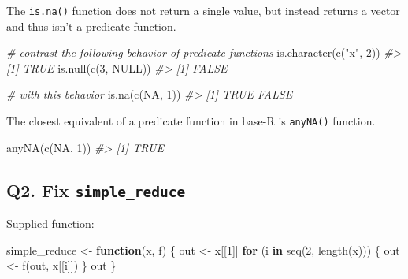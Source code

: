 \documentclass[
]{book}
\newenvironment{Shaded}{\begin{snugshade}}{\end{snugshade}}
\newcommand{\CommentTok}[1]{\textcolor[rgb]{0.56,0.35,0.01}{\textit{#1}}}
\newcommand{\ConstantTok}[1]{\textcolor[rgb]{0.00,0.00,0.00}{#1}}
\newcommand{\ControlFlowTok}[1]{\textcolor[rgb]{0.13,0.29,0.53}{\textbf{#1}}}
\newcommand{\DecValTok}[1]{\textcolor[rgb]{0.00,0.00,0.81}{#1}}
\newcommand{\FunctionTok}[1]{\textcolor[rgb]{0.00,0.00,0.00}{#1}}
\newcommand{\NormalTok}[1]{#1}
\newcommand{\OtherTok}[1]{\textcolor[rgb]{0.56,0.35,0.01}{#1}}
\newcommand{\StringTok}[1]{\textcolor[rgb]{0.31,0.60,0.02}{#1}}
\begin{document}
The \texttt{is.na()} function does not return a single value, but instead returns a vector and thus isn't a predicate function.

\begin{Shaded}
\begin{Highlighting}[]
\CommentTok{\# contrast the following behavior of predicate functions}
\FunctionTok{is.character}\NormalTok{(}\FunctionTok{c}\NormalTok{(}\StringTok{"x"}\NormalTok{, }\DecValTok{2}\NormalTok{))}
\CommentTok{\#\textgreater{} [1] TRUE}
\FunctionTok{is.null}\NormalTok{(}\FunctionTok{c}\NormalTok{(}\DecValTok{3}\NormalTok{, }\ConstantTok{NULL}\NormalTok{))}
\CommentTok{\#\textgreater{} [1] FALSE}

\CommentTok{\# with this behavior}
\FunctionTok{is.na}\NormalTok{(}\FunctionTok{c}\NormalTok{(}\ConstantTok{NA}\NormalTok{, }\DecValTok{1}\NormalTok{))}
\CommentTok{\#\textgreater{} [1]  TRUE FALSE}
\end{Highlighting}
\end{Shaded}

The closest equivalent of a predicate function in base-R is \texttt{anyNA()} function.

\begin{Shaded}
\begin{Highlighting}[]
\FunctionTok{anyNA}\NormalTok{(}\FunctionTok{c}\NormalTok{(}\ConstantTok{NA}\NormalTok{, }\DecValTok{1}\NormalTok{))}
\CommentTok{\#\textgreater{} [1] TRUE}
\end{Highlighting}
\end{Shaded}

\hypertarget{q2.-fix-simple_reduce}{%
\subsection*{\texorpdfstring{Q2. Fix \texttt{simple\_reduce}}{Q2. Fix simple\_reduce}}\label{q2.-fix-simple_reduce}}

Supplied function:

\begin{Shaded}
\begin{Highlighting}[]
\NormalTok{simple\_reduce }\OtherTok{\textless{}{-}} \ControlFlowTok{function}\NormalTok{(x, f) \{}
\NormalTok{  out }\OtherTok{\textless{}{-}}\NormalTok{ x[[}\DecValTok{1}\NormalTok{]]}
  \ControlFlowTok{for}\NormalTok{ (i }\ControlFlowTok{in} \FunctionTok{seq}\NormalTok{(}\DecValTok{2}\NormalTok{, }\FunctionTok{length}\NormalTok{(x))) \{}
\NormalTok{    out }\OtherTok{\textless{}{-}} \FunctionTok{f}\NormalTok{(out, x[[i]])}
\NormalTok{  \}}
\NormalTok{  out}
\NormalTok{\}}
\end{Highlighting}
\end{Shaded}
\end{document}
